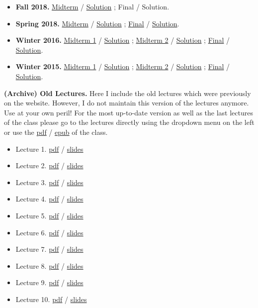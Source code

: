 \documentclass[]{book}
\providecommand{\tightlist}{%
  \setlength{\itemsep}{0pt}\setlength{\parskip}{0pt}}
\theoremstyle{definition}
\theoremstyle{definition}
\theoremstyle{definition}
\theoremstyle{remark}
\begin{document}
\begin{itemize}
\tightlist
\item
  \textbf{Fall 2018.} \href{past-exams/2018F-midterm.pdf}{Midterm} /
  \href{past-exams/2018F-midterm-solution.pdf}{Solution} ; Final /
  Solution.
\item
  \textbf{Spring 2018.} \href{past-exams/2018S-midterm.pdf}{Midterm} /
  \href{past-exams/2018S-midterm-solution.pdf}{Solution} ;
  \href{past-exams/2018S-final.pdf}{Final} /
  \href{past-exams/2018S-final-solution.pdf}{Solution}.
\item
  \textbf{Winter 2016.} \href{past-exams/2016W-midterm1.pdf}{Midterm 1}
  / \href{past-exams/2016W-midterm1-solution.pdf}{Solution} ;
  \href{past-exams/2016W-midterm2.pdf}{Midterm 2} /
  \href{past-exams/2016W-midterm2-solution.pdf}{Solution} ;
  \href{past-exams/2016W-final.pdf}{Final} /
  \href{past-exams/2016W-final-solution.pdf}{Solution}.
\item
  \textbf{Winter 2015.} \href{past-exams/2015W-midterm1.pdf}{Midterm 1}
  / \href{past-exams/2015W-midterm1-solution.pdf}{Solution} ;
  \href{past-exams/2015W-midterm2.pdf}{Midterm 2} /
  \href{past-exams/2015W-midterm2-solution.pdf}{Solution} ;
  \href{past-exams/2015W-final.pdf}{Final} /
  \href{past-exams/2015W-final-solution.pdf}{Solution}.
\end{itemize}

\textbf{(Archive) Old Lectures.} Here I include the old lectures which
were previously on the website. However, I do not maintain this version
of the lectures anymore. Use at your own peril! For the most up-to-date
version as well as the last lectures of the class please go to the
lectures directly using the dropdown menu on the left or use the
\href{ucla-102-fall2018.pdf}{pdf} / \href{ucla-102-fall2018.epub}{epub}
of the class.

\begin{itemize}
\tightlist
\item
  Lecture 1. \href{old/lecture1.pdf}{pdf} /
  \href{old/lecture1-slides.pdf}{slides}
\item
  Lecture 2. \href{old/lecture2.pdf}{pdf} /
  \href{old/lecture2-slides.pdf}{slides}
\item
  Lecture 3. \href{old/lecture3.pdf}{pdf} /
  \href{old/lecture3-slides.pdf}{slides}
\item
  Lecture 4. \href{old/lecture4.pdf}{pdf} /
  \href{old/lecture4-slides.pdf}{slides}
\item
  Lecture 5. \href{old/lecture5.pdf}{pdf} /
  \href{old/lecture5-slides.pdf}{slides}
\item
  Lecture 6. \href{old/lecture6.pdf}{pdf} /
  \href{old/lecture6-slides.pdf}{slides}
\item
  Lecture 7. \href{old/lecture7.pdf}{pdf} /
  \href{old/lecture7-slides.pdf}{slides}
\item
  Lecture 8. \href{old/lecture8.pdf}{pdf} /
  \href{old/lecture8-slides.pdf}{slides}
\item
  Lecture 9. \href{old/lecture9.pdf}{pdf} /
  \href{old/lecture9-slides.pdf}{slides}
\item
  Lecture 10. \href{old/lecture10.pdf}{pdf} /
  \href{old/lecture10-slides.pdf}{slides}
\end{itemize}
\end{document}
